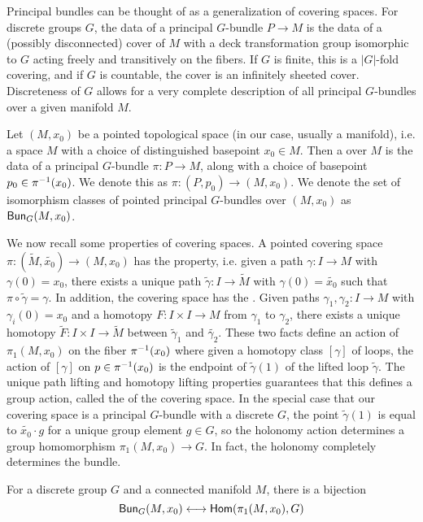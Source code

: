 %
Principal bundles can be thought of as a generalization of covering spaces.
For discrete groups $G$, the data of a principal $G$-bundle $P \to M$ is the
data of a (possibly disconnected) cover of $M$ with a deck transformation
group isomorphic to $G$ acting freely and transitively on the fibers. If
$G$ is finite, this is a $|G|$-fold covering, and if $G$ is countable, the
cover is an infinitely sheeted cover. Discreteness of $G$ allows for a very
complete description of all principal $G$-bundles over a given manifold $M$.
%
\begin{defn}
 Let $(M,x_0)$ be a pointed topological space (in our case, usually a manifold),
 i.e. a space $M$ with a choice of distinguished basepoint $x_0 \in M$. Then
 a  over $M$ is the data of a principal $G$-bundle
 $\pi : P \to M$, along with a choice of basepoint $p_0 \in \pi^{-1}(x_0)$. We
 denote this as $\pi : (P,p_0) \to (M, x_0)$. We denote the set of isomorphism
 classes of pointed principal $G$-bundles over $(M,x_0)$ as $\mathsf{Bun}_G(M ,x_0)$.
\end{defn}
%
We now recall some properties of covering spaces. A pointed covering space
$\pi : (\tilde{M}, \tilde{x_0}) \to (M, x_0)$ has the  property,
i.e. given a path $\gamma : I \to M$ with $\gamma(0) = x_0$, there exists a
unique path $\tilde{\gamma} : I \to \tilde{M}$ with $\gamma(0) = \tilde{x_0}$
such that $\pi \circ \tilde{\gamma} = \gamma$. In addition, the covering
space has the . Given paths
$\gamma_1, \gamma_2 : I \to M$ with $\gamma_i(0) = x_0$ and a homotopy
$F : I \times I \to M$ from $\gamma_1$ to $\gamma_2$, there exists a unique
homotopy $\tilde{F} : I \times I \to \tilde{M}$ between $\tilde{\gamma}_1$
and $\tilde{\gamma_2}$. These two facts define an action of $\pi_1(M, x_0)$
on the fiber $\pi^{-1}(x_0)$ where given a homotopy class $[\gamma]$ of
loops, the action of $[\gamma]$ on $p \in \pi^{-1}(x_0)$ is the endpoint
of $\tilde{\gamma}(1)$ of the lifted loop $\tilde{\gamma}$. The unique
path lifting and homotopy lifting properties guarantees that this defines
a group action, called the  of the covering space. In the
special case that our covering space is a principal $G$-bundle with a discrete $G$,
the point $\tilde{\gamma}(1)$ is equal to $\tilde{x_0} \cdot g$ for a unique
group element $g \in G$, so the holonomy action determines a group homomorphism
$\pi_1(M, x_0) \to G$. In fact, the holonomy completely determines the bundle.
%
\begin{thm}
 For a discrete group $G$ and a connected manifold $M$, there is a bijection
 \[
  \mathsf{Bun}_G(M,x_0) \longleftrightarrow \mathsf{Hom}(\pi_1(M,x_0), G)
 \]
\end{thm}
